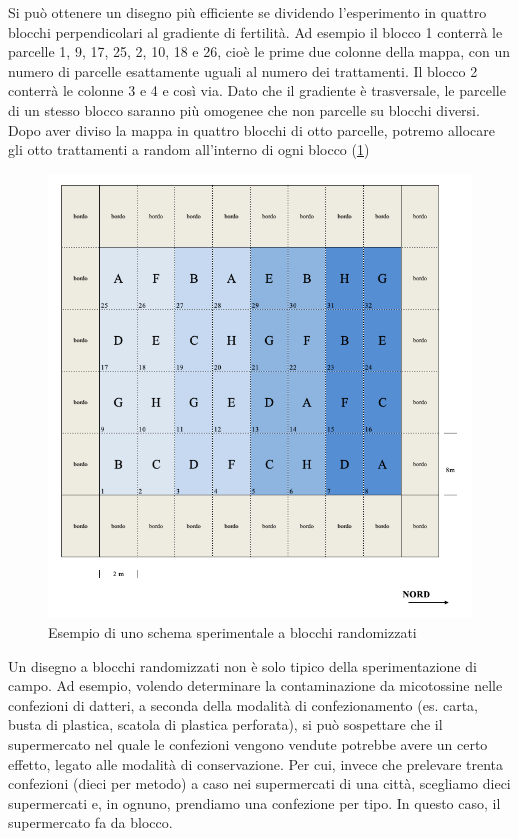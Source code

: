 \documentclass[a4paper,12pt,oneside]{book}
\begin{document}
Si può ottenere un disegno più efficiente se dividendo l'esperimento in quattro blocchi perpendicolari al gradiente di fertilità. Ad esempio il blocco 1 conterrà le parcelle 1, 9, 17, 25, 2, 10, 18 e 26, cioè le prime due colonne della mappa, con un numero di parcelle esattamente uguali al numero dei trattamenti. Il blocco 2 conterrà le colonne 3 e 4 e così via. Dato che il gradiente è trasversale, le parcelle di un stesso blocco saranno più omogenee che non parcelle su blocchi diversi. Dopo aver diviso la mappa in quattro blocchi di otto parcelle, potremo allocare gli otto trattamenti a random all'interno di ogni blocco (\ref{fig:figName34})

\begin{figure}

{\centering \includegraphics[width=0.9\linewidth]{_images/Mappa1CRBD} 

}

\caption{Esempio di uno schema sperimentale a blocchi randomizzati}\label{fig:figName34}
\end{figure}

Un disegno a blocchi randomizzati non è solo tipico della sperimentazione di campo. Ad esempio, volendo determinare la contaminazione da micotossine nelle confezioni di datteri, a seconda della modalità di confezionamento (es. carta, busta di plastica, scatola di plastica perforata), si può sospettare che il supermercato nel quale le confezioni vengono vendute potrebbe avere un certo effetto, legato alle modalità di conservazione. Per cui, invece che prelevare trenta confezioni (dieci per metodo) a caso nei supermercati di una città, scegliamo dieci supermercati e, in ognuno, prendiamo una confezione per tipo. In questo caso, il supermercato fa da blocco.
\end{document}
